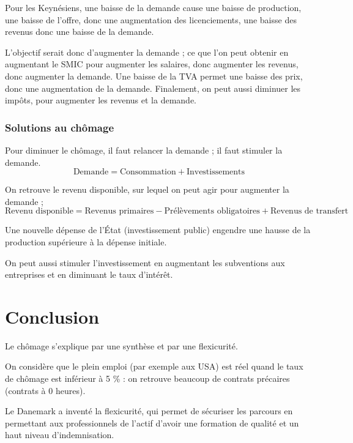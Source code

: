 \documentclass[10pt,a4paper,french]{article}
\begin{document}
Pour les Keynésiens, une baisse de la demande cause une baisse de production, une baisse de l'offre, donc une augmentation des licenciements, une baisse des revenus donc une baisse de la demande.

L'objectif serait donc d'augmenter la demande ; ce que l'on peut obtenir en augmentant le SMIC pour augmenter les salaires, donc augmenter les revenus, donc augmenter la demande. Une baisse de la TVA permet une baisse des prix, donc une augmentation de la demande. Finalement, on peut aussi diminuer les impôts, pour augmenter les revenus et la demande.

\subsubsection{Solutions au chômage}
Pour diminuer le chômage, il faut relancer la demande ; il faut stimuler la demande.
\[ \text{Demande} = \text{Consommation} + \text{Investissements} \]

On retrouve le revenu disponible, sur lequel on peut agir pour augmenter la demande ;
\[ \text{Revenu disponible} = \text{Revenus primaires} - \text{Prélèvements obligatoires} + \text{Revenus de transfert} \]

Une nouvelle dépense de l'État (investissement public) engendre une hausse de la production supérieure à la dépense initiale.

On peut aussi stimuler l'investissement en augmentant les subventions aux entreprises et en diminuant le taux d’intérêt.

\section{Conclusion}
Le chômage s'explique par une synthèse et par une flexicurité.

On considère que le plein emploi (par exemple aux USA) est réel quand le taux de chômage est inférieur à 5 \% : on retrouve beaucoup de contrats précaires (contrats à 0 heures).

Le Danemark a inventé la flexicurité, qui permet de sécuriser les parcours en permettant aux professionnels de l’actif d’avoir une formation de qualité et un haut niveau d’indemnisation.

\appendix %

\printglossaries
\end{document}
